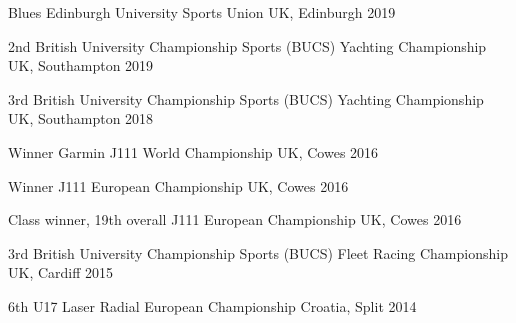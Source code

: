 



\begin{cvhonors}
  \cvhonor
    {Blues} %
    {Edinburgh University Sports Union} %
    {UK, Edinburgh} %
    {2019} %

  \cvhonor
    {2nd} %
    {British University Championship Sports (BUCS) Yachting Championship} %
    {UK, Southampton} %
    {2019} %
    

  \cvhonor
    {3rd} %
    {British University Championship Sports (BUCS) Yachting Championship} %
    {UK, Southampton} %
    {2018} %


  \cvhonor
    {Winner} %
    {Garmin J111 World Championship} %
    {UK, Cowes} %
    {2016} %

  \cvhonor
    {Winner} %
    {J111 European Championship} %
    {UK, Cowes} %
    {2016} %

  \cvhonor
    {Class winner, 19th overall} %
    {J111 European Championship} %
    {UK, Cowes} %
    {2016} %
    


  \cvhonor
    {3rd} %
    {British University Championship Sports (BUCS) Fleet Racing Championship} %
    {UK, Cardiff} %
    {2015} %


  \cvhonor
    {6th U17} %
    {Laser Radial European Championship} %
    {Croatia, Split} %
    {2014} %



\end{cvhonors}


